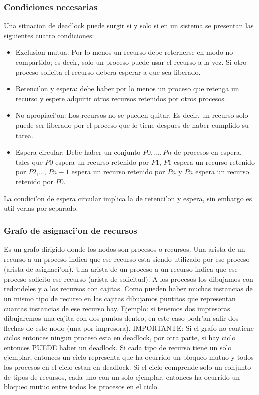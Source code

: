 \documentclass[a4paper,10pt]{article}
\begin{document}
\subsubsection{Condiciones necesarias}
Una situacion de deadlock puede surgir si y solo si en un sistema se presentan las siguientes cuatro condiciones:
\begin{itemize}
 \item Exclusion mutua: Por lo menos un recurso debe reternerse en modo no compartido; es decir, solo un proceso puede usar el recurso a la vez. Si otro proceso solicita el recurso debera esperar a que sea liberado.
 \item Retenci'on y espera: debe haber por lo menos un proceso que retenga un recurso y espere adquirir otros recursos retenidos por otros procesos.
 \item No apropiaci'on: Los recursos no se pueden quitar. Es decir, un recurso solo puede ser liberado por el proceso que lo tiene despues de haber cumplido su tarea.
 \item Espera circular: Debe haber un conjunto ${P0,...,Pn}$ de procesos en espera, tales que $P0$ espera un recurso retenido por $P1$, $P1$ espera un recurso retenido por $P2$,..., $Pn-1$ espera un recurso retenido por $Pn$ y $Pn$ espera un recurso retenido por $P0$.
\end{itemize}
La condici'on de espera circular implica la de retenci'on y espera, sin embargo es util verlas por separado.

\subsubsection{Grafo de asignaci'on de recursos}
Es un grafo dirigido donde los nodos son procesos o recursos. Una arista de un recurso a un proceso indica que ese recurso esta siendo utilizado por ese proceso (arista de asignaci'on). Una arista de un proceso a un recurso indica que ese proceso solicito ese recurso (arista de solicitud).
A los procesos los dibujamos con redondeles y a los recursos con cajitas. Como pueden haber muchas instancias de un mismo tipo de recurso en las cajitas dibujamos puntitos que representan cuantas instancias de ese recurso hay. Ejemplo: si tenemos dos impresoras dibujaremos una cajita con dos puntos dentro, en este caso podr'an salir dos flechas de este nodo (una por impresora). 
IMPORTANTE: Si el grafo no contiene ciclos entonces ningun proceso esta en deadlock, por otra parte, si hay ciclo entonces PUEDE haber un deadlock.
Si cada tipo de recurso tiene un solo ejemplar, entonces un ciclo representa que ha ocurrido un bloqueo mutuo y todos los procesos en el ciclo estan en deadlock.
Si el ciclo comprende solo un conjunto de tipos de recursos, cada uno con un solo ejemplar, entonces ha ocurrido un bloqueo mutuo entre todos los procesos en el ciclo.
\end{document}
